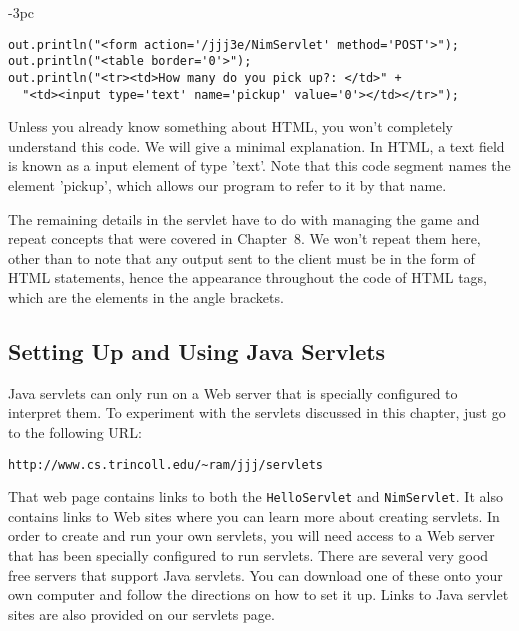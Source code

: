 {{{{\begin{jjjlistingleft}[29pc]{-3pc}
\begin{lstlisting}
out.println("<form action='/jjj3e/NimServlet' method='POST'>");
out.println("<table border='0'>");
out.println("<tr><td>How many do you pick up?: </td>" +
  "<td><input type='text' name='pickup' value='0'></td></tr>");
\end{lstlisting}
\end{jjjlistingleft}

\noindent Unless you already know something about HTML, you won't
completely understand this code. We will give a minimal
explanation. In HTML, a text field is known as a input element of type
'text'.  Note that this code segment names the element 'pickup', which
allows our program to refer to it by that name.

The remaining details in the servlet have to do with managing the game
and repeat concepts that were covered in Chapter~8. We won't repeat
them here, other than to note that any output sent to the client must
be in the form of HTML statements, hence the appearance throughout the
code of HTML tags, which are the elements in the angle brackets.

\subsection{Setting Up and Using Java Servlets}

Java servlets can only run on a Web server that is specially
configured to interpret them.  To experiment with
the servlets discussed in this chapter, just go to the
following URL:

\begin{jjjlisting}
\begin{lstlisting}[commentstyle=\color{black}]
http://www.cs.trincoll.edu/~ram/jjj/servlets
\end{lstlisting}
\end{jjjlisting}

\noindent That web page contains links to both the {\tt HelloServlet}
and {\tt NimServlet}.  It also contains links to Web sites where you
can learn more about creating servlets. In order to create and run
your own servlets, you will need access to a Web server that has been
specially configured to run servlets.  There are several very good
free servers that support Java servlets. You can download one of these
onto your own computer and follow the directions on how to set it up.
Links to Java servlet sites are also provided on our servlets page. 


}}}}
